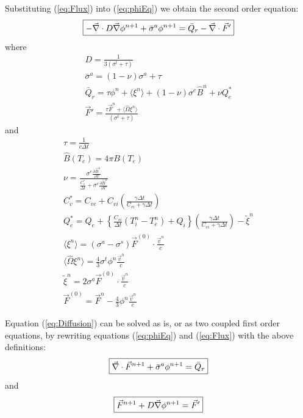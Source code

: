 \documentclass{article}
\newcommand{\dt}{\ensuremath{\Delta t}}
\newcommand{\cviOdt}{\ensuremath{\frac{C_{vi}}{\dt}}}
\newcommand{\Cvs}{\ensuremath{C_{v}^{*}}}
\newcommand{\Bn}{\ensuremath{\hat{B}^{n}}}
\newcommand{\pBndT}{\ensuremath{\frac{\partial\Bn}{\partial T}}}
\begin{document}
Substituting (\ref{eq:Flux}) into (\ref{eq:phiEq}) we obtain
the second order equation:
\begin{equation}
   \boxed{
	 - \vec{\nabla} \cdot D \vec{\nabla} \phi^{n+1} +  \bar{\sigma}^{a} \phi^{n+1}
		= \bar{Q}_{r} - \vec{\nabla} \cdot \vec{F}'
         }
\label{eq:Diffusion}
\end{equation}
where
\begin{gather}
	D = \frac{1}{3(\sigma^{t} + \tau) } 
  \label{eq:quant_i}
  \\
	\bar{\sigma}^{a} = (1 - \nu) \sigma^{a} + \tau 
  \\
	\bar{Q}_{r} =\tau \phi^{n}
		+ \langle \xi^{n} \rangle
		+ (1 - \nu) \sigma^{e} \Bn  + \nu Q_{e}^{*} 
  \\
	\vec{F}' = \frac{\tau \vec{F}^{n}
			+ \langle \hat{\Omega} \xi^{n} \rangle}
	       {(\sigma^{t} + \tau)}
\end{gather}
and
\begin{gather}
	\tau = \frac{1}{c\dt}
  \\
	\hat{B}(T_{e}) = 4\pi B(T_{e})
  \\
	\nu = \frac{\sigma^{e} \pBndT } {\frac{\Cvs}{\dt} + \sigma^{e}\pBndT}
  \\
	\Cvs = C_{ve} + C_{vi} \left(\frac{\gamma\dt}{C_{vi}+\gamma\dt}\right)
  \\
	Q_{e}^{*} = Q_{e} + \left\{ \cviOdt (T_{i}^{n} - T_{e}^{n}) +
				Q_{i} \right\}
		\left(\frac{\gamma\dt}{C_{vi}+\gamma\dt}\right) -
		\tilde{\xi}^{n}
  \\
	\langle \xi^{n} \rangle =
			(\sigma^{a} - \sigma^{s}) \vec{F}^{(0)}
			\cdot \frac{\vec{v}^{n}}{c}
  \\
	\langle \hat{\Omega} \xi^{n} \rangle =
		\frac{4}{3} \sigma^{t} \phi^{n} \frac{\vec{v}^{n}}{c}
  \\
	\tilde{\xi}^{n} = 2 \sigma^{a} \vec{F}^{(0)} \cdot
				\frac{\vec{v}^{n}}{c}
  \\
	\vec{F}^{(0)} = \vec{F}^{n} - \frac{4}{3} \phi^{n}
						\frac{\vec{v}^{n}}{c}
  \label{eq:quant_f}
\end{gather}

Equation (\ref{eq:Diffusion}) can be solved as is,
or as two coupled first order equations,
by rewriting equations (\ref{eq:phiEq}) and (\ref{eq:Flux}) with the above
definitions:
\begin{equation}
   \boxed{
	\vec{\nabla} \cdot \vec{F}^{n+1} + \bar{\sigma}^{a} \phi^{n+1}
		= \bar{Q}_{r}
         }
\label{eq:phi2}
\end{equation}
and
\begin{equation}
   \boxed{
	\vec{F}^{n+1} + D \vec{\nabla} \phi^{n+1} =  \vec{F}'
         }
\label{eq:Flux2}
\end{equation}
\end{document}
